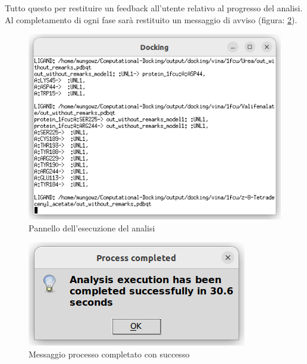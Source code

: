 Tutto questo per restituire un feedback all'utente relativo al progresso del analisi. Al completamento di ogni fase sarà restituito un messaggio di avviso (figura: \ref{fig:progress completed analysis}).

\begin{figure}[H]
    \centering
    \includegraphics[scale=0.8]{immagini/capitolo3/analysisExecution.png}
    \caption{Pannello dell'esecuzione del analisi}
    \label{fig:analysis execution}
\end{figure}

\begin{figure}[H]
    \centering
    \includegraphics{immagini/capitolo3/progressCompletedAnalysis.png}
    \caption{Messaggio processo completato con successo}
    \label{fig:progress completed analysis}
\end{figure}
